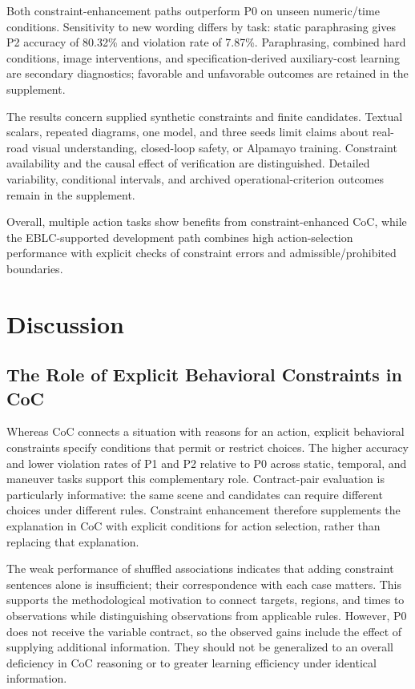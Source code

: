 \documentclass[nolineno]{ieeeaccess}
\begin{document}
Both constraint-enhancement paths outperform P0 on unseen numeric/time conditions. Sensitivity to new wording differs by task: static paraphrasing gives P2 accuracy of 80.32\% and violation rate of 7.87\%. Paraphrasing, combined hard conditions, image interventions, and specification-derived auxiliary-cost learning are secondary diagnostics; favorable and unfavorable outcomes are retained in the supplement.\par

The results concern supplied synthetic constraints and finite candidates. Textual scalars, repeated diagrams, one model, and three seeds limit claims about real-road visual understanding, closed-loop safety, or Alpamayo training. Constraint availability and the causal effect of verification are distinguished. Detailed variability, conditional intervals, and archived operational-criterion outcomes remain in the supplement.\par

Overall, multiple action tasks show benefits from constraint-enhanced CoC, while the EBLC-supported development path combines high action-selection performance with explicit checks of constraint errors and admissible/prohibited boundaries.\par
\clearpage
\section{Discussion}

\subsection{The Role of Explicit Behavioral Constraints in CoC}

Whereas CoC connects a situation with reasons for an action, explicit behavioral constraints specify conditions that permit or restrict choices. The higher accuracy and lower violation rates of P1 and P2 relative to P0 across static, temporal, and maneuver tasks support this complementary role. Contract-pair evaluation is particularly informative: the same scene and candidates can require different choices under different rules. Constraint enhancement therefore supplements the explanation in CoC with explicit conditions for action selection, rather than replacing that explanation.\par

The weak performance of shuffled associations indicates that adding constraint sentences alone is insufficient; their correspondence with each case matters. This supports the methodological motivation to connect targets, regions, and times to observations while distinguishing observations from applicable rules. However, P0 does not receive the variable contract, so the observed gains include the effect of supplying additional information. They should not be generalized to an overall deficiency in CoC reasoning or to greater learning efficiency under identical information.\par
\end{document}

